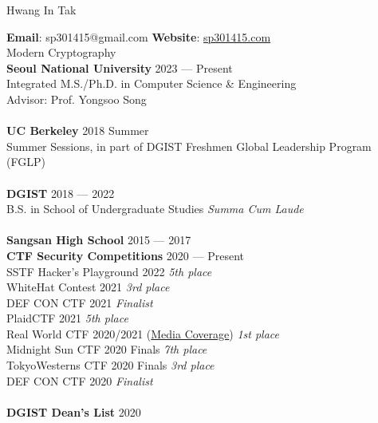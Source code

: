 \documentclass[a4paper, 11pt]{article}
\begin{document}
{\Huge Hwang In Tak} \hfill

\vspace{0.5cm}

\textbf{Email}: sp301415@gmail.com \hspace{0.5cm} \textbf{Website}: \href{https://sp301415.com}{sp301415.com} \\

Modern Cryptography \\

\textbf{Seoul National University} \hfill 2023 --- Present \\
Integrated M.S./Ph.D. in Computer Science \& Engineering \\
Advisor: Prof. Yongsoo Song \\
\\
\textbf{UC Berkeley} \hfill 2018 Summer \\
Summer Sessions, in part of DGIST Freshmen Global Leadership Program (FGLP) \\
\\
\textbf{DGIST} \hfill 2018 --- 2022 \\
B.S. in School of Undergraduate Studies \hfill \textit{Summa Cum Laude} \\
\\
\textbf{Sangsan High School} \hfill 2015 --- 2017 \\

\textbf {CTF Security Competitions} \hfill 2020 --- Present \\
SSTF Hacker's Playground 2022 \hfill \textit{5th place} \\
WhiteHat Contest 2021 \hfill \textit{3rd place} \\
DEF CON CTF 2021 \hfill \textit{Finalist} \\
PlaidCTF 2021 \hfill \textit{5th place} \\
Real World CTF 2020/2021 (\href{https://www.boannews.com/media/view.asp?idx=94063}{Media Coverage})  \hfill \textit{1st place} \\
Midnight Sun CTF 2020 Finals \hfill \textit{7th place} \\
TokyoWesterns CTF 2020 Finals \hfill \textit{3rd place} \\
DEF CON CTF 2020 \hfill \textit{Finalist} \\
\\
\textbf{DGIST Dean's List} \hfill 2020 \\
\end{document}
